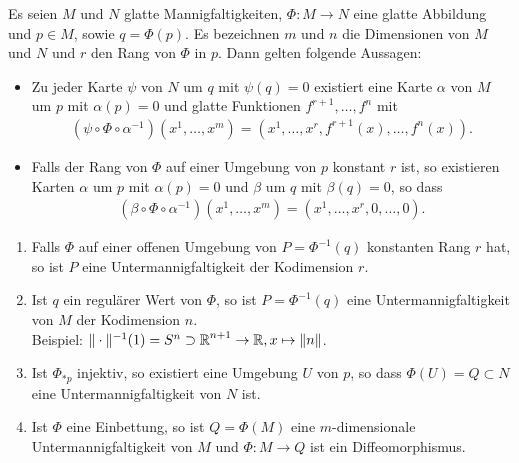 \begin{satz}
  Es seien $M$ und $N$ glatte Mannigfaltigkeiten, $\Phi \colon M \to N$ eine glatte Abbildung und $p \in M$, sowie $q = \Phi(p)$. Es bezeichnen $m$ und $n$ die Dimensionen von $M$ und $N$ und $r$ den Rang von $\Phi$ in $p$. Dann gelten folgende Aussagen:
  \begin{itemize}
  \item Zu jeder Karte $\psi$ von $N$ um $q$ mit $\psi(q) = 0$ existiert eine Karte $\alpha$ von $M$ um $p$ mit $\alpha(p) = 0$ und glatte Funktionen $f^{r+1},\ldots,f^n$ mit
    \begin{align*}
      \left(\psi \circ \Phi \circ \alpha^{-1}\right)\left(x^1,\ldots, x^m\right) = \left(x^1, \ldots, x^{r}, f^{r+1}(x), \ldots, f^n(x)\right).
    \end{align*}
  \item Falls der Rang von $\Phi$ auf einer Umgebung von $p$ konstant $r$ ist, so existieren Karten $\alpha$ um $p$ mit $\alpha(p) = 0$ und $\beta$ um $q$ mit $\beta(q) = 0$, so dass
    \begin{align*}
      \left(\beta \circ \Phi \circ \alpha^{-1}\right)\left(x^1, \ldots, x^m\right) = \left(x^1, \ldots, x^r, 0, \ldots, 0\right).
    \end{align*}
  \end{itemize}
\end{satz} 

\begin{kor}
  \begin{enumerate}[label=(\roman*)]
  \item Falls $\Phi$ auf einer offenen Umgebung von $P = \Phi^{-1}(q)$ konstanten Rang $r$ hat, so ist $P$ eine Untermannigfaltigkeit der Kodimension $r$.
  \item Ist $q$ ein regulärer Wert von $\Phi$, so ist $P = \Phi^{-1}(q)$ eine Untermannigfaltigkeit von $M$ der Kodimension $n$.\\
    Beispiel: $\|\cdot\|^{-1}(1) = S^n \supset \operatorname{\mathbb{R}}^{n+1} \to \operatorname{\mathbb{R}}, x \mapsto \|n\|$.
  \item Ist $\Phi_{*p}$ injektiv, so existiert eine Umgebung $U$ von $p$, so dass $\Phi(U) = Q \subset N$ eine Untermannigfaltigkeit von $N$ ist.
  \item Ist $\Phi$ eine Einbettung, so ist $Q = \Phi(M)$ eine $m$-dimensionale Untermannigfaltigkeit von $M$ und $\Phi \colon M \to Q$ ist ein Diffeomorphismus.
  \end{enumerate}
\end{kor}

